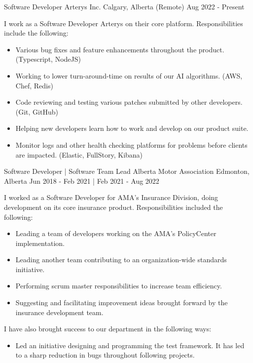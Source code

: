 
\begin{cventries}
    \cventry
        {Software Developer}
        {Arterys Inc.}
        {Calgary, Alberta (Remote)}
        {Aug 2022 - Present}
        {
            I work as a Software Developer Arterys on their core platform.  Responsibilities include the following:
            \begin{itemize}
                \item Various bug fixes and feature enhancements throughout the product. (Typescript, NodeJS)
                \item Working to lower turn-around-time on results of our AI algorithms. (AWS, Chef, Redis)
                \item Code reviewing and testing various patches submitted by other developers. (Git, GitHub)
                \item Helping new developers learn how to work and develop on our product suite. 
                \item Monitor logs and other health checking platforms for problems before clients are impacted. (Elastic, FullStory, Kibana)
            \end{itemize}
        }
    \cventry
        {Software Developer | Software Team Lead}
        {Alberta Motor Association}
        {Edmonton, Alberta}
        {Jun 2018 - Feb 2021 | Feb 2021 - Aug 2022}
        {
            I worked as a Software Developer for AMA’s Insurance Division, doing development on its core insurance product.  Responsibilities included the following:
            \begin{itemize}
                \item Leading a team of developers working on the AMA's PolicyCenter implementation.
                \item Leading another team contributing to an organization-wide standards initiative.
                \item Performing scrum master responsibilities to increase team efficiency.
                \item Suggesting and facilitating improvement ideas brought forward by the insurance development team.
            \end{itemize}
            I have also brought success to our department in the following ways:
            \begin{itemize}
                \item Led an initiative designing and programming the test framework.  It has led to a sharp reduction in bugs throughout following projects.

\end{itemize}}
\end{cventries}
